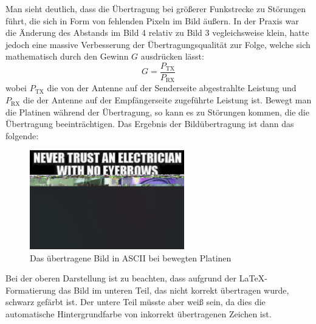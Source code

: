 Man sieht deutlich, dass die Übertragung bei größerer Funkstrecke zu Störungen führt, die sich in Form von fehlenden Pixeln im Bild äußern. 
In der Praxis war die Änderung des Abstands im Bild 4 relativ zu Bild 3 vegleichsweise klein, hatte jedoch eine massive Verbesserung der Übertragungsqualität zur Folge, 
welche sich mathematisch durch den Gewinn $G$ ausdrücken lässt: 
\begin{equation}
    G = \frac{P_\text{TX}}{P_\text{RX}}
\end{equation}
wobei $P_\text{TX}$ die von der Antenne auf der Senderseite abgestrahlte Leistung und $P_\text{RX}$ die der Antenne auf der Empfängerseite zugeführte Leistung ist.
\clearpage
Bewegt man die Platinen während der Übertragung, so kann es zu Störungen kommen, die die Übertragung beeinträchtigen. Das Ergebnis der Bildübertragung ist dann das folgende:
\begin{figure}[H]
    \centering
    \includegraphics[width=0.6\textwidth]{Pictures/memeASCIIbewegt.jpg}
    \caption{Das übertragene Bild in ASCII bei bewegten Platinen}
    \label{fig:Task2e}
\end{figure}
Bei der oberen Darstellung ist zu beachten, dass aufgrund der LaTeX-Formatierung das Bild im unteren Teil, das nicht korrekt übertragen wurde, schwarz gefärbt ist. Der untere Teil müsste aber weiß sein, da dies die automatische Hintergrundfarbe von inkorrekt übertragenen Zeichen ist. 